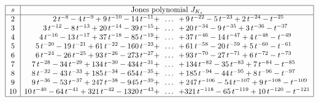 \documentclass[11pt]{amsart}
\theoremstyle{plain}
\theoremstyle{definition}
\begin{document}
\begin{table}
$$
{\setlength{\jot}{1.5ex}
\begin{array}{|c | r c l | }
\hline
s & \multicolumn{3}{c|}{\mbox{Jones polynomial } J_{K_s} } \\
\hline
2 &  2 \,t ^{-8} -4 \,t ^{-9} +9 \,t ^{-10} -14 \,t ^{-11} + & \!\! \ldots \!\! & +\, 9 \,t ^{-22} -5 \,t ^{-23} +2 \,t ^{-24} -t ^{-25} \\
3 & 3 \,t ^{-12} -8 \,t ^{-13} +20 \,t ^{-14} -39 \,t ^{-15} + & \!\! \ldots \!\!  & +\,20 \,t ^{-34} -9 \,t ^{-35} +3 \,t ^{-36} -t ^{-37}  \\
4 & 4 \,t ^{-16} -13 \,t ^{-17} +37 \,t ^{-18} -85 \,t ^{-19} + & \!\! \ldots \!\!  & +\,37 \,t ^{-46} -14 \,t ^{-47} +4 \,t ^{-48} -t ^{-49}  \\
5 & 5 \,t ^{-20} -19 \,t ^{-21} +61 \,t ^{-22} -160 \,t ^{-23} + & \!\! \ldots \!\!  & +\,61 \,t ^{-58} -20 \,t ^{-59} +5 \,t ^{-60} -t ^{-61} \\
6 & 6 \,t ^{-24} -26 \,t ^{-25} +93 \,t ^{-26} -273 \,t ^{-27} + & \!\! \ldots \!\!  & +\,93 \,t ^{-70} -27 \,t ^{-71} +6 \,t ^{-72} -t ^{-73} \\
7 & 7 \,t ^{-28} -34 \,t ^{-29} +134 \,t ^{-30} -434 \,t ^{-31} + & \!\! \ldots \!\!  & +\,134 \,t ^{-82} -35 \,t ^{-83} +7 \,t ^{-84} -t ^{-85} \\
8 & 8 \,t ^{-32} -43 \,t ^{-33} +185 \,t ^{-34} -654 \,t ^{-35} + & \!\! \ldots \!\!  & +\,185 \,t ^{-94} -44 \,t ^{-95} +8 \,t ^{-96} -t ^{-97} \\
9 & 9 \,t ^{-36} -53 \,t ^{-37} +247 \,t ^{-38} -945 \,t ^{-39} + & \!\! \ldots \!\!  & +\,247 \,t ^{-106} -54 \,t ^{-107} +9 \,t ^{-108} -t ^{-109} \\
10 & 10 \,t ^{-40} -64 \,t ^{-41} +321 \,t ^{-42} -1320 \,t ^{-43} + & \!\! \ldots \!\!  & +321 \,t ^{-118} -65 \,t ^{-119} +10 \,t ^{-120} -t ^{-121} \\\hline
\end{array}
}
$$
\caption{The head and tail of the Jones polynomial for the first few values of $s$ in Proposition \ref{prop:cancelation}. These values were computed independently by two pieces of software: {\tt jpclosed.c} by Nathan Broaddus 
and the Mathematica package {\tt KnotTheory`} by Dror Bar-Natan.
\label{table:jones}}
\end{table}
\end{document}
